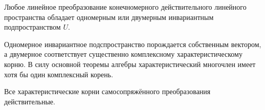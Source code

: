   \begin{lemm}\label{23.1.lemm}
  Любое линейное преобразование конечномерного действительного линейного пространства обладает одномерным или двумерным инвариантным подпространством $U$.
  \end{lemm}
  \begin{notion}
  Одномерное инвариантное подспространство порождается собственным вектором, а двумерное соответствует существенно комплексному характеристическому корню. В силу основной теоремы алгебры характеристический многочлен имеет хотя бы один комплексный корень.
  \end{notion}
  
  \begin{thm}\label{23.1.thm1}
  Все характеристические корни самосопряжённого преобразования действительные.
  \end{thm}
